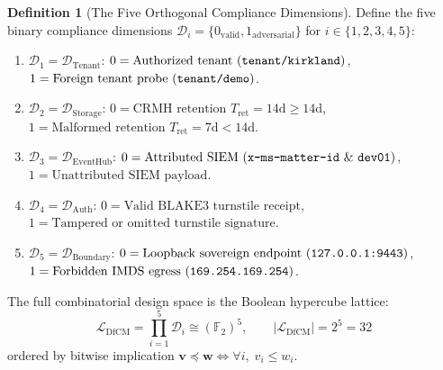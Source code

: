 \documentclass[10pt,twoside,openany]{book}
\theoremstyle{plain}
\theoremstyle{definition}
\newtheorem{definition}[theorem]{Definition}
\theoremstyle{remark}
\newcommand{\F}{\mathbb{F}}
\begin{document}
\begin{definition}[The Five Orthogonal Compliance Dimensions]
Define the five binary compliance dimensions $\mathcal{D}_i = \{0_{\mathrm{valid}}, 1_{\mathrm{adversarial}}\}$ for $i \in \{1, 2, 3, 4, 5\}$:
\begin{enumerate}
    \item $\mathcal{D}_1 = \mathcal{D}_{\mathrm{Tenant}}$: $0 = \text{Authorized tenant (\texttt{tenant/kirkland})}$, $1 = \text{Foreign tenant probe (\texttt{tenant/demo})}$.
    \item $\mathcal{D}_2 = \mathcal{D}_{\mathrm{Storage}}$: $0 = \text{CRMH retention } T_{\mathrm{ret}} = 14\text{d} \ge 14\text{d}$, $1 = \text{Malformed retention } T_{\mathrm{ret}} = 7\text{d} < 14\text{d}$.
    \item $\mathcal{D}_3 = \mathcal{D}_{\mathrm{EventHub}}$: $0 = \text{Attributed SIEM (\texttt{x-ms-matter-id} \& \texttt{dev01})}$, $1 = \text{Unattributed SIEM payload}$.
    \item $\mathcal{D}_4 = \mathcal{D}_{\mathrm{Auth}}$: $0 = \text{Valid BLAKE3 turnstile receipt}$, $1 = \text{Tampered or omitted turnstile signature}$.
    \item $\mathcal{D}_5 = \mathcal{D}_{\mathrm{Boundary}}$: $0 = \text{Loopback sovereign endpoint (\texttt{127.0.0.1:9443})}$, $1 = \text{Forbidden IMDS egress (\texttt{169.254.169.254})}$.
\end{enumerate}
The full combinatorial design space is the Boolean hypercube lattice:
\begin{equation}
\mathcal{L}_{\mathrm{DfCM}} = \prod_{i=1}^5 \mathcal{D}_i \cong (\F_2)^5, \qquad |\mathcal{L}_{\mathrm{DfCM}}| = 2^5 = 32
\end{equation}
ordered by bitwise implication $\mathbf{v} \preceq \mathbf{w} \iff \forall i,\; v_i \le w_i$.
\end{definition}
\end{document}
